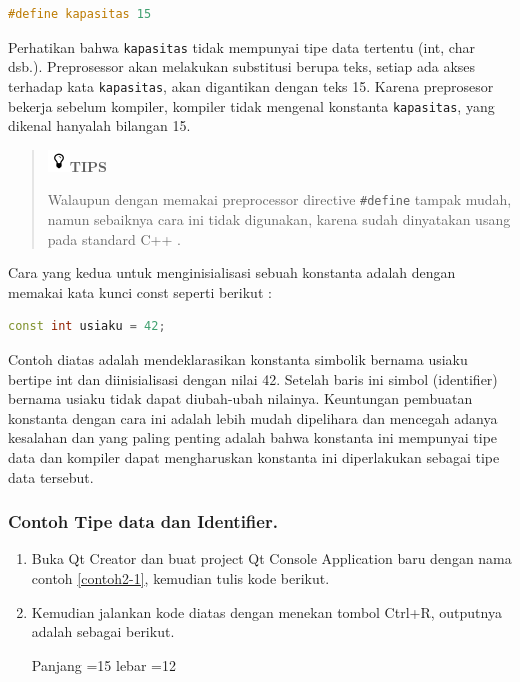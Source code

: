 \begin{lstlisting}[language=c++, numbers=none]
#define kapasitas 15
\end{lstlisting}

Perhatikan bahwa \texttt{kapasitas} tidak mempunyai tipe data tertentu
(int, char dsb.). Preprosessor akan melakukan substitusi berupa teks,
setiap ada akses terhadap kata \texttt{kapasitas}, akan digantikan
dengan teks 15. Karena preprosesor bekerja sebelum kompiler, kompiler
tidak mengenal konstanta \texttt{kapasitas}, yang dikenal hanyalah
bilangan 15.

\begin{quotation}
\includegraphics{../manuscript/images/tips.png}\textbf{TIPS} 

Walaupun
dengan memakai preprocessor directive \texttt{\#define} tampak mudah,
namun sebaiknya cara ini tidak digunakan, karena sudah dinyatakan usang
pada standard C++ .
\end{quotation}
 

Cara yang kedua untuk menginisialisasi sebuah konstanta adalah dengan
memakai kata kunci const seperti berikut :

\begin{lstlisting}[language=c++, numbers=none]
const int usiaku = 42;
\end{lstlisting}

Contoh diatas adalah mendeklarasikan konstanta simbolik bernama usiaku
bertipe int dan diinisialisasi dengan nilai 42. Setelah baris ini simbol
(identifier) bernama usiaku tidak dapat diubah-ubah nilainya. Keuntungan
pembuatan konstanta dengan cara ini adalah lebih mudah dipelihara dan
mencegah adanya kesalahan dan yang paling penting adalah bahwa konstanta
ini mempunyai tipe data dan kompiler dapat mengharuskan konstanta ini
diperlakukan sebagai tipe data tersebut.

\subsubsection*{Contoh Tipe data dan Identifier.}

\begin{enumerate}

\item
  Buka Qt Creator dan buat project Qt Console Application baru dengan
  nama contoh \ref{contoh2-1}, kemudian tulis kode berikut.



\item
  Kemudian jalankan kode diatas dengan menekan tombol Ctrl+R, outputnya
  adalah sebagai berikut.

\begin{lcverbatim}
Panjang =15
lebar =12
\end{lcverbatim}

\end{enumerate}


